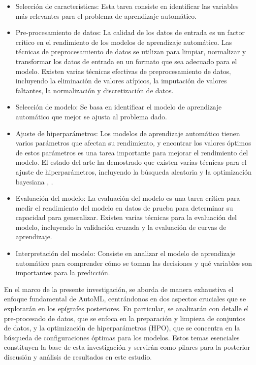 \begin{itemize}
	\item Selección de características: Esta tarea consiste en identificar las variables más relevantes para el problema de aprendizaje automático. 
	\item Pre-procesamiento de datos: La calidad de los datos de entrada es un factor crítico en el rendimiento de los modelos de aprendizaje automático. Las técnicas de preprocesamiento de datos se utilizan para limpiar, normalizar y transformar los datos de entrada en un formato que sea adecuado para el modelo. Existen varias técnicas efectivas de preprocesamiento de datos, incluyendo la eliminación de valores atípicos, la imputación de valores faltantes, la normalización y discretización de datos.
	\item Selección de modelo: Se basa en identificar el modelo de aprendizaje automático que mejor se ajusta al problema dado.
	\item Ajuste de hiperparámetros: Los modelos de aprendizaje automático tienen varios parámetros que afectan su rendimiento, y encontrar los valores óptimos de estos parámetros es una tarea importante para mejorar el rendimiento del modelo. El estado del arte ha demostrado que existen varias técnicas para el ajuste de hiperparámetros, incluyendo la búsqueda aleatoria \citep{zoller2021benchmark} y la optimización bayesiana \citep{he2021automl}, \citep{hutter2019automated}.
	\item Evaluación del modelo: La evaluación del modelo es una tarea crítica para medir el rendimiento del modelo en datos de prueba para determinar su capacidad para generalizar. Existen varias técnicas para la evaluación del modelo, incluyendo la validación cruzada y la evaluación de curvas de aprendizaje.
	\item Interpretación del modelo: Consiste en analizar el modelo de aprendizaje automático para comprender cómo se toman las decisiones y qué variables son importantes para la predicción.
\end{itemize}

En el marco de la presente investigación, se aborda de manera exhaustiva el enfoque fundamental de AutoML, centrándonos en dos aspectos cruciales que se explorarán en los epígrafes posteriores. En particular, se analizarán con detalle el pre-procesado de datos, que se enfoca en la preparación y limpieza de conjuntos de datos, y la optimización de hiperparámetros (HPO), que se concentra en la búsqueda de configuraciones óptimas para los modelos. Estos temas esenciales constituyen la base de esta investigación y servirán como pilares para la posterior discusión y análisis de resultados en este estudio. 

